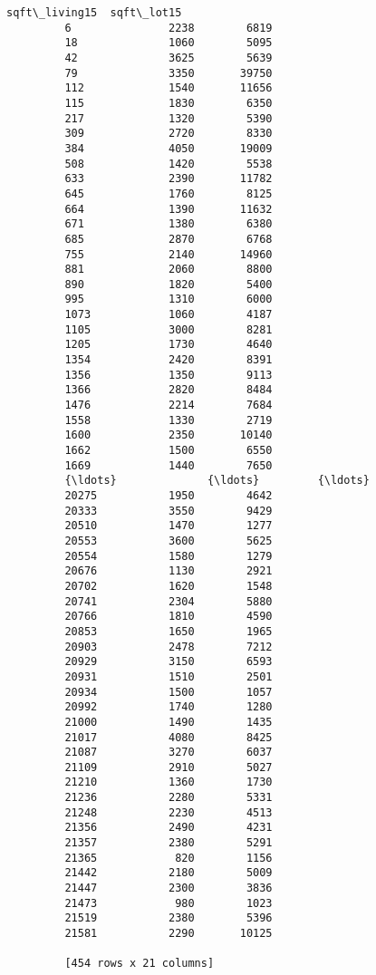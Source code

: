 \documentclass[11pt]{article}
\begin{document}
\begin{Verbatim}[commandchars=\\\{\}]
                sqft\_living15  sqft\_lot15  
         6               2238        6819  
         18              1060        5095  
         42              3625        5639  
         79              3350       39750  
         112             1540       11656  
         115             1830        6350  
         217             1320        5390  
         309             2720        8330  
         384             4050       19009  
         508             1420        5538  
         633             2390       11782  
         645             1760        8125  
         664             1390       11632  
         671             1380        6380  
         685             2870        6768  
         755             2140       14960  
         881             2060        8800  
         890             1820        5400  
         995             1310        6000  
         1073            1060        4187  
         1105            3000        8281  
         1205            1730        4640  
         1354            2420        8391  
         1356            1350        9113  
         1366            2820        8484  
         1476            2214        7684  
         1558            1330        2719  
         1600            2350       10140  
         1662            1500        6550  
         1669            1440        7650  
         {\ldots}              {\ldots}         {\ldots}  
         20275           1950        4642  
         20333           3550        9429  
         20510           1470        1277  
         20553           3600        5625  
         20554           1580        1279  
         20676           1130        2921  
         20702           1620        1548  
         20741           2304        5880  
         20766           1810        4590  
         20853           1650        1965  
         20903           2478        7212  
         20929           3150        6593  
         20931           1510        2501  
         20934           1500        1057  
         20992           1740        1280  
         21000           1490        1435  
         21017           4080        8425  
         21087           3270        6037  
         21109           2910        5027  
         21210           1360        1730  
         21236           2280        5331  
         21248           2230        4513  
         21356           2490        4231  
         21357           2380        5291  
         21365            820        1156  
         21442           2180        5009  
         21447           2300        3836  
         21473            980        1023  
         21519           2380        5396  
         21581           2290       10125  
         
         [454 rows x 21 columns]
\end{Verbatim}
            
\end{document}
